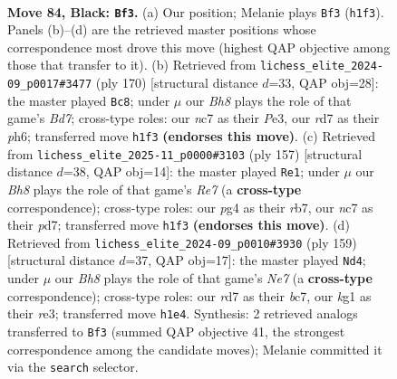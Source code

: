 \documentclass[11pt]{article}
\begin{document}
\clearpage

\begin{figure}[p]\centering
\begin{subfigure}{0.46\textwidth}\centering
\resizebox{\linewidth}{!}{%
\newchessgame
\chessboard[
  setfen={8/P1NR4/8/5Pk1/np4P1/7B/7P/6Kb b - - 2 84},
  showmover=false,
  pgfstyle=straightmove, color=movearrow, markmove={h1-f3}
]}
\caption{}
\end{subfigure}\hfill
\begin{subfigure}{0.46\textwidth}\centering
\resizebox{\linewidth}{!}{%
\newchessgame
\chessboard[
  setfen={8/3B4/3kp2p/5pb1/7p/4PP1K/8/8 w - - 8 86},
  showmover=false,
  pgfstyle=straightmove, color=movearrow, markmove={d7-c8}
]}
\caption{}
\end{subfigure}
\\[4pt]
\begin{subfigure}{0.46\textwidth}\centering
\resizebox{\linewidth}{!}{%
\newchessgame
\chessboard[
  setfen={8/1R1P4/5b2/2k5/1p2PB2/pP3K2/4r3/8 b - - 2 79},
  showmover=false,
  pgfstyle=straightmove, color=movearrow, markmove={e2-e1}
]}
\caption{}
\end{subfigure}\hfill
\begin{subfigure}{0.46\textwidth}\centering
\resizebox{\linewidth}{!}{%
\newchessgame
\chessboard[
  setfen={8/P1B5/3N1k2/8/8/KP2R2p/4n1bP/8 b - - 6 80},
  showmover=false,
  pgfstyle=straightmove, color=movearrow, markmove={e2-d4}
]}
\caption{}
\end{subfigure}
\caption{\textbf{Move 84, Black: \texttt{Bf3}.} (a) Our position; Melanie plays \texttt{Bf3} (\texttt{h1f3}). Panels (b)--(d) are the retrieved master positions whose correspondence most drove this move (highest QAP objective among those that transfer to it). (b) Retrieved from \texttt{lichess\_elite\_2024-09\_p0017\#3477} (ply 170) [structural distance $d$=33, QAP obj=28]: the master played \texttt{Bc8}; under $\mu$ our \emph{Bh8} plays the role of that game's \emph{Bd7}; cross-type roles: our \emph{n}c7 as their \emph{P}e3, our \emph{r}d7 as their \emph{p}h6; transferred move \texttt{h1f3} \textbf{(endorses this move)}. (c) Retrieved from \texttt{lichess\_elite\_2025-11\_p0000\#3103} (ply 157) [structural distance $d$=38, QAP obj=14]: the master played \texttt{Re1}; under $\mu$ our \emph{Bh8} plays the role of that game's \emph{Re7} (a \textbf{cross-type} correspondence); cross-type roles: our \emph{p}g4 as their \emph{r}b7, our \emph{n}c7 as their \emph{p}d7; transferred move \texttt{h1f3} \textbf{(endorses this move)}. (d) Retrieved from \texttt{lichess\_elite\_2024-09\_p0010\#3930} (ply 159) [structural distance $d$=37, QAP obj=17]: the master played \texttt{Nd4}; under $\mu$ our \emph{Bh8} plays the role of that game's \emph{Ne7} (a \textbf{cross-type} correspondence); cross-type roles: our \emph{r}d7 as their \emph{b}c7, our \emph{k}g1 as their \emph{r}e3; transferred move \texttt{h1e4}. Synthesis: 2 retrieved analogs transferred to \texttt{Bf3} (summed QAP objective 41, the strongest correspondence among the candidate moves); Melanie committed it via the \texttt{search} selector.}
\label{fig:thought-m167}
\end{figure}
\end{document}
